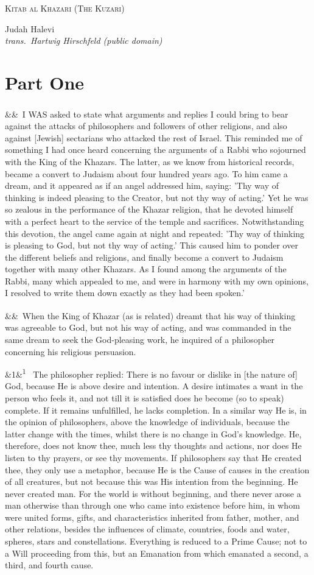 \documentclass[12pt]{article}
\newcommand{\work}[1]{\begin{center}\LARGE\scshape #1\end{center}}
\newcommand{\attrib}[2]{\begin{center}\large #1\\[2pt]\small\itshape trans.\ #2\end{center}\vspace{1em}}
\newcommand{\para}[1][]{\par\noindent\ifx&#1&\else\textsuperscript{\footnotesize #1}~\fi}
\begin{document}
\work{Kitab al Khazari (The Kuzari)}

\attrib{Judah Halevi}{Hartwig Hirschfeld (public domain)}

\section*{Part One}

\para I WAS asked to state what arguments and replies I could bring to bear against the attacks of philosophers and followers of other religions, and also against [Jewish] sectarians who attacked the rest of Israel. This reminded me of something I had once heard concerning the arguments of a Rabbi who sojourned with the King of the Khazars. The latter, as we know from historical records, became a convert to Judaism about four hundred years ago. To him came a dream, and it appeared as if an angel addressed him, saying: 'Thy way of thinking is indeed pleasing to the Creator, but not thy way of acting.' Yet he was so zealous in the performance of the Khazar religion, that he devoted himself with a perfect heart to the service of the temple and sacrifices. Notwithstanding this devotion, the angel came again at night and repeated: 'Thy way of thinking is pleasing to God, but not thy way of acting.' This caused him to ponder over the different beliefs and religions, and finally become a convert to Judaism together with many other Khazars. As I found among the arguments of the Rabbi, many which appealed to me, and were in harmony with my own opinions, I resolved to write them down exactly as they had been spoken.'

\para When the King of Khazar (as is related) dreamt that his way of thinking was agreeable to God, but not his way of acting, and was commanded in the same dream to seek the God-pleasing work, he inquired of a philosopher concerning his religious persuasion.

\para[1] The philosopher replied: There is no favour or dislike in [the nature of] God, because He is above desire and intention. A desire intimates a want in the person who feels it, and not till it is satisfied does he become (so to speak) complete. If it remains unfulfilled, he lacks completion. In a similar way He is, in the opinion of philosophers, above the knowledge of individuals, because the latter change with the times, whilst there is no change in God's knowledge. He, therefore, does not know thee, much less thy thoughts and actions, nor does He listen to thy prayers, or see thy movements. If philosophers say that He created thee, they only use a metaphor, because He is the Cause of causes in the creation of all creatures, but not because this was His intention from the beginning. He never created man. For the world is without beginning, and there never arose a man otherwise than through one who came into existence before him, in whom were united forms, gifts, and characteristics inherited from father, mother, and other relations, besides the influences of climate, countries, foods and water, spheres, stars and constellations. Everything is reduced to a Prime Cause; not to a Will proceeding from this, but an Emanation from which emanated a second, a third, and fourth cause.
\end{document}

